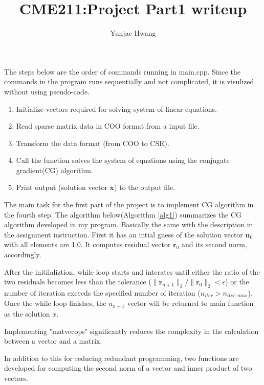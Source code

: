 \documentclass{article}
\title{CME211:Project Part1 writeup}
\author{Yunjae Hwang}
\begin{document}
\maketitle

The steps below are the order of commands running in main.cpp.
Since the commands in the program runs sequentially and not complicated, 
it is visulized without using pseudo-code.
\begin{enumerate}
    \item Initialize vectors required for solving system of linear equations.
    \item Read sparse matrix data in COO format from a input file.
    \item Transform the data format (from COO to CSR).
    \item Call the function solves the system of equations 
    using the conjugate gradient(CG) algorithm.
    \item Print output (solution vector $\mathbf{x}$) to the output file.
\end{enumerate}

The main task for the first part of the project is 
to implement CG algorithm in the fourth step.
The algorithm below(Algorithm \ref{alg1}) summarizes 
the CG algorithm developed in my program.
Basically the same with the description 
in the assignment instruction.
First it has an intial guess of the solution vector 
$\mathbf{u}_0$ with all elements are 1.0.
It computes residual vector $\mathbf{r}_0$ 
and its second norm, accordingly.

After the initilaliztion, while loop starts and interates 
until either the ratio of the two residuals 
becomes less than the tolerance 
($ \|\mathbf{r}_{n+1}\|_2 / \|\mathbf{r}_0\|_2 < \epsilon $) or
the number of iteration exceeds the specified number of iteration 
($n_{iter} > n_{iter,max}$).
Once the while loop finishes, 
the $u_{n+1}$ vector will be returned to main function as the solution $x$.

Implementing "matvecops" significantly reduces the complexity 
in the calculation between a vector and a matrix.

In addition to this for reducing redundant programming, 
two functions are developed for computing the second norm of a vector 
and inner product of two vectors.
\end{document}
